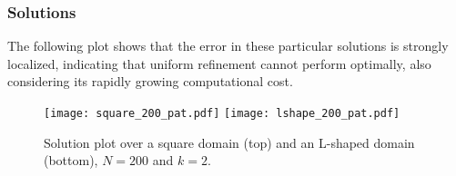\newpage
\subsubsection{Solutions}

The following plot shows that the error in these particular solutions is strongly localized, indicating that uniform refinement cannot perform optimally, also considering its rapidly growing computational cost.

\begin{figure}[!ht]
	\centering
	\texttt{[image: square\_200\_pat.pdf]}
    \texttt{[image: lshape\_200\_pat.pdf]}
	\caption{Solution plot over a square domain (top) and an L-shaped domain (bottom), $N = 200$ and $k = 2$.}
\end{figure}